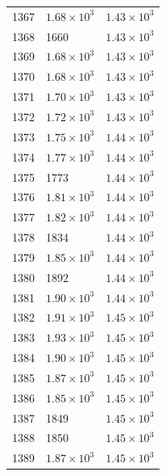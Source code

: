 \begin{table}[H]
\begin{tabular}{lll}
1367 & $\displaystyle 1.68 \times 10^{3}$ & $\displaystyle 1.43 \times 10^{3}$ \\
1368 & 1660 & $\displaystyle 1.43 \times 10^{3}$ \\
1369 & $\displaystyle 1.68 \times 10^{3}$ & $\displaystyle 1.43 \times 10^{3}$ \\
1370 & $\displaystyle 1.68 \times 10^{3}$ & $\displaystyle 1.43 \times 10^{3}$ \\
1371 & $\displaystyle 1.70 \times 10^{3}$ & $\displaystyle 1.43 \times 10^{3}$ \\
1372 & $\displaystyle 1.72 \times 10^{3}$ & $\displaystyle 1.43 \times 10^{3}$ \\
1373 & $\displaystyle 1.75 \times 10^{3}$ & $\displaystyle 1.44 \times 10^{3}$ \\
1374 & $\displaystyle 1.77 \times 10^{3}$ & $\displaystyle 1.44 \times 10^{3}$ \\
1375 & 1773 & $\displaystyle 1.44 \times 10^{3}$ \\
1376 & $\displaystyle 1.81 \times 10^{3}$ & $\displaystyle 1.44 \times 10^{3}$ \\
1377 & $\displaystyle 1.82 \times 10^{3}$ & $\displaystyle 1.44 \times 10^{3}$ \\
1378 & 1834 & $\displaystyle 1.44 \times 10^{3}$ \\
1379 & $\displaystyle 1.85 \times 10^{3}$ & $\displaystyle 1.44 \times 10^{3}$ \\
1380 & 1892 & $\displaystyle 1.44 \times 10^{3}$ \\
1381 & $\displaystyle 1.90 \times 10^{3}$ & $\displaystyle 1.44 \times 10^{3}$ \\
1382 & $\displaystyle 1.91 \times 10^{3}$ & $\displaystyle 1.45 \times 10^{3}$ \\
1383 & $\displaystyle 1.93 \times 10^{3}$ & $\displaystyle 1.45 \times 10^{3}$ \\
1384 & $\displaystyle 1.90 \times 10^{3}$ & $\displaystyle 1.45 \times 10^{3}$ \\
1385 & $\displaystyle 1.87 \times 10^{3}$ & $\displaystyle 1.45 \times 10^{3}$ \\
1386 & $\displaystyle 1.85 \times 10^{3}$ & $\displaystyle 1.45 \times 10^{3}$ \\
1387 & 1849 & $\displaystyle 1.45 \times 10^{3}$ \\
1388 & 1850 & $\displaystyle 1.45 \times 10^{3}$ \\
1389 & $\displaystyle 1.87 \times 10^{3}$ & $\displaystyle 1.45 \times 10^{3}$ \\

\end{tabular}
\end{table}
